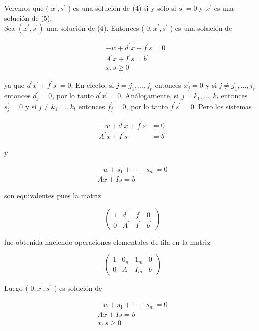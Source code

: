 \documentclass[10pt]{article}
\begin{document}
Veremos que ( $x^{\prime}, s^{\prime}$ ) es una solución de (4) si y sólo si $s^{\prime}=0$ y $x^{\prime}$ es una solución de (5).\\
Sea $\left(x^{\prime}, s^{\prime}\right)$ una solución de (4). Entonces ( $0, x^{\prime}, s^{\prime}$ ) es una solución de

$$
\begin{aligned}
& -w+d^{\prime} x+f^{\prime} s=0 \\
& A^{\prime} x+I^{\prime} s=b^{\prime} \\
& x, s \geq 0
\end{aligned}
$$

ya que $d^{\prime} x^{\prime}+f^{\prime} s^{\prime}=0$. En efecto, si $j=j_{1}, \ldots, j_{r}$ entonces $x_{j}^{\prime}=0$ y si $j \neq j_{1}, \ldots, j_{r}$ entonces $d_{j}^{\prime}=0$, por lo tanto $d^{\prime} x^{\prime}=0$. Análogamente, si $j=k_{1}, \ldots, k_{t}$ entonces $s_{j}^{\prime}=0$ y si $j \neq k_{1}, \ldots, k_{t}$ entonces $f_{j}^{\prime}=0$, por lo tanto $f^{\prime} s^{\prime}=0$. Pero los sistemas

$$
\begin{aligned}
-w+d^{\prime} x+f^{\prime} s & =0 \\
A^{\prime} x+I^{\prime} s & =b^{\prime}
\end{aligned}
$$

y

$$
\begin{array}{r}
-w+s_{1}+\cdots+s_{m}=0 \\
A x+I s=b
\end{array}
$$

son equivalentes pues la matriz

$$
\left(\begin{array}{ccc|c}
1 & d^{\prime} & f^{\prime} & 0 \\
0 & A^{\prime} & I^{\prime} & b^{\prime}
\end{array}\right)
$$

fue obtenida haciendo operaciones elementales de fila en la matriz

$$
\left(\begin{array}{ccc|c}
1 & 0_{n} & 1_{m} & 0 \\
0 & A & I_{m} & b
\end{array}\right)
$$

Luego ( $0, x^{\prime}, s^{\prime}$ ) es solución de

$$
\begin{array}{r}
-w+s_{1}+\cdots+s_{m}=0 \\
A x+I s=b \\
x, s \geq 0
\end{array}
$$
\end{document}
